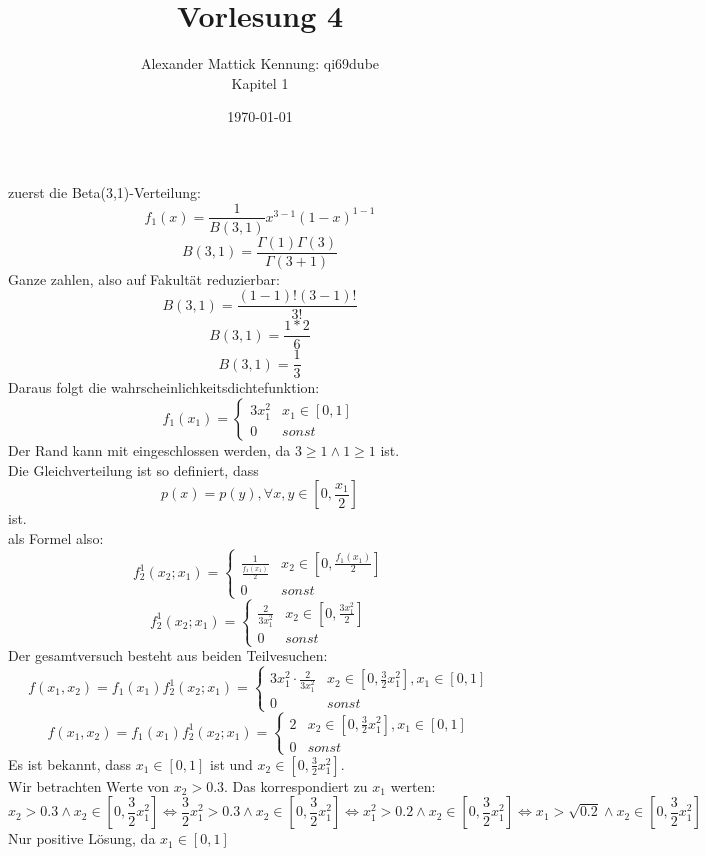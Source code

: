 \documentclass{article}
\author{
Alexander Mattick Kennung: qi69dube\\
Kapitel 1
}
\date{\today}
\title{Vorlesung 4}
\begin{document}
	\maketitle
	zuerst die Beta(3,1)-Verteilung:\\
	\[f_1(x)=\frac{1}{B(3,1)}x^{3-1}(1-x)^{1-1}\]
	\[B(3,1)=\frac{\Gamma(1)\Gamma(3)}{\Gamma(3+1)}\]
	Ganze zahlen, also auf Fakultät reduzierbar:\\
	\[B(3,1)=\frac{(1-1)!(3-1)!}{3!}\]
	\[B(3,1)=\frac{1*2}{6}\]
	\[B(3,1)=\frac{1}{3}\]
	Daraus folgt die wahrscheinlichkeitsdichtefunktion:\\
	\[f_1(x_1)=\begin{cases}3x_1^2&x_1\in[0,1]\\0&sonst\end{cases}\]
	Der Rand kann mit eingeschlossen werden, da $3\geq 1\land 1\geq 1$ ist.\\
	Die Gleichverteilung ist so definiert, dass\\
	\[p(x)=p(y), \forall x,y\in[0,\frac{x_1}{2}]\]
	ist.\\
	als Formel also:
	\[f^1_2(x_2;x_1) = \begin{cases}\frac{1}{\frac{f_1(x_1)}{2}}&x_2\in[0,\frac{f_1(x_1)}{2}]\\0&sonst\end{cases}\]
	\[f^1_2(x_2;x_1) = \begin{cases}\frac{2}{3x_1^2}&x_2\in[0,\frac{3x_1^2}{2}]\\0&sonst\end{cases}\]
	Der gesamtversuch besteht aus beiden Teilvesuchen:
	\[f(x_1,x_2) = f_1(x_1)f^1_2(x_2; x_1) = \begin{cases}3x_1^2\cdot \frac{2}{3x_1^2}&x_2\in[0,\frac{3}{2}x_1^2],x_1\in[0,1]\\ 0&sonst\end{cases}\]
	\[f(x_1,x_2) = f_1(x_1)f^1_2(x_2; x_1) = \begin{cases}2&x_2\in[0,\frac{3}{2}x_1^2],x_1\in[0,1]\\ 0&sonst\end{cases}\]
	Es ist bekannt, dass $x_1\in[0,1]$ ist und $x_2\in [0,\frac{3}{2}x_1^2]$.\\
	Wir betrachten Werte von $x_2>0.3$. Das korrespondiert zu $x_1$ werten:\\
	\[x_2>0.3\land x_2\in[0,\frac{3}{2}x_1^2] \iff \frac{3}{2}x_1^2>0.3 \land x_2\in[0,\frac{3}{2}x_1^2] \iff x_1^2> 0.2 \land x_2\in [0,\frac{3}{2}x_1^2] \iff x_1>\sqrt{0.2} \land x_2\in [0,\frac{3}{2}x_1^2]\]
	Nur positive Lösung, da $x_1\in[0,1]$\\
\end{document}
